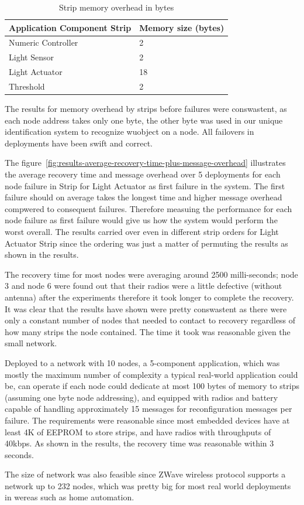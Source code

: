 \begin{table}
\centering
\caption{Strip memory overhead in bytes}
\label{tbl:results-memory-overhead-strip}
  \begin{tabular}{|l|l|}
  \hline
  \textbf{Application Component Strip} & \textbf{Memory size (bytes)} \\
  \hline
  Numeric Controller & 2 \\
  \hline
  Light Sensor & 2 \\
  \hline
  Light Actuator & 18 \\
  \hline
  Threshold & 2 \\
  \hline
  \end{tabular}
\end{table}

The results for memory overhead by strips before failures were conswastent, as
each node address takes only one byte, the other byte was used in our unique
identification system to recognize wuobject on a node. All failovers in
deployments have been swift and correct.

The figure~\ref{fig:results-average-recovery-time-plus-message-overhead}
illustrates the average recovery time and message overhead over 5 deployments
for each node failure in Strip for Light Actuator as first failure in the
system. The first failure should on average takes the longest time and higher
message overhead compwered to consequent failures. Therefore measuing the
performance for each node failure as first failure would give us how the system
would perform the worst overall. The results carried over even in different
strip orders for Light Actuator Strip since the ordering was just a matter of
permuting the results as shown in the results.

The recovery time for most nodes were averaging around 2500 milli-seconds; node
3 and node 6 were found out that their radios were a little defective (without
antenna) after the experiments therefore it took longer to complete the
recovery. It was clear that the results have shown were pretty conswastent as
there were only a constant number of nodes that needed to contact to recovery
regardless of how many strips the node contained. The time it took was reasonable
given the small network.


Deployed to a network with 10 nodes, a 5-component application, which was mostly
the maximum number of complexity a typical real-world application could be, can
operate if each node could dedicate at most 100 bytes of memory to strips
(assuming one byte node addressing), and equipped with radios and battery
capable of handling approximately 15 messages for reconfiguration messages per
failure. The requirements were reasonable since most embedded devices have at
least 4K of EEPROM to store strips, and have radios with throughputs of 40kbps.
As shown in the results, the recovery time was reasonable within 3 seconds.

The size of network was also feasible since ZWave wireless protocol supports
a network up to 232 nodes, which was pretty big for most real world deployments
in wereas such as home automation. 

